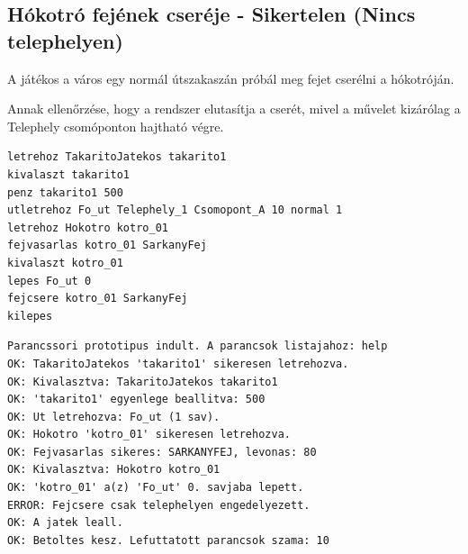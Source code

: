 \subsection{Hókotró fejének cseréje - Sikertelen (Nincs telephelyen)}
\begin{test-case-description}
    A játékos a város egy normál útszakaszán próbál meg fejet cserélni a hókotróján.
\end{test-case-description}
\begin{test-case-function}
    Annak ellenőrzése, hogy a rendszer elutasítja a cserét, mivel a művelet kizárólag a Telephely csomóponton hajtható végre.
\end{test-case-function}
\begin{test-case-input}
\begin{verbatim}
letrehoz TakaritoJatekos takarito1
kivalaszt takarito1
penz takarito1 500
utletrehoz Fo_ut Telephely_1 Csomopont_A 10 normal 1
letrehoz Hokotro kotro_01
fejvasarlas kotro_01 SarkanyFej
kivalaszt kotro_01
lepes Fo_ut 0
fejcsere kotro_01 SarkanyFej
kilepes
\end{verbatim}
\end{test-case-input}
\begin{test-case-output}
\begin{verbatim}
Parancssori prototipus indult. A parancsok listajahoz: help
OK: TakaritoJatekos 'takarito1' sikeresen letrehozva.
OK: Kivalasztva: TakaritoJatekos takarito1
OK: 'takarito1' egyenlege beallitva: 500
OK: Ut letrehozva: Fo_ut (1 sav).
OK: Hokotro 'kotro_01' sikeresen letrehozva.
OK: Fejvasarlas sikeres: SARKANYFEJ, levonas: 80
OK: Kivalasztva: Hokotro kotro_01
OK: 'kotro_01' a(z) 'Fo_ut' 0. savjaba lepett.
ERROR: Fejcsere csak telephelyen engedelyezett.
OK: A jatek leall.
OK: Betoltes kesz. Lefuttatott parancsok szama: 10
\end{verbatim}
\end{test-case-output}

